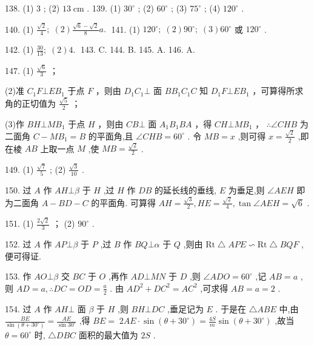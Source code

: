 \documentclass[10pt]{article}
\begin{document}
138. (1) 3 ; (2) \({13}\mathrm{\;{cm}}\) . 139. (1) \({30}^{ \circ  }\) ; (2) \({60}^{ \circ  }\) ; (3) \({75}^{ \circ  }\) ; (4) \({120}^{ \circ  }\) .

140. (1) \(\frac{\sqrt{2}}{4};\;\left( 2\right) \frac{\sqrt{6} - \sqrt{2}}{8}a.\;\) 141. (1) \({120}^{ \circ  };\;\left( 2\right) {90}^{ \circ  };\;\left( 3\right) {60}^{ \circ  }\) 或 \({120}^{ \circ  }\) .

142. (1) \(\frac{30}{13};\;\left( 2\right) 4.\;\) 143. C. 144. B. 145. A. 146. A.

147. (1) \(\frac{\sqrt{6}}{3}\) ；

(2)准 \({C}_{1}F \bot  E{B}_{1}\) 于点 \(F\) ，则由 \({D}_{1}{C}_{1} \bot\) 面 \(B{B}_{1}{C}_{1}C\) 知 \({D}_{1}F \bot  E{B}_{1}\) ，可算得所求角的正切值为 \(\frac{\sqrt{5}}{2}\) ；

(3)作 \({BH} \bot  M{B}_{1}\) 于点 \(H\) ，则由 \({CB} \bot\) 面 \({A}_{1}{B}_{1}{BA}\) ，得 \({CH} \bot  {M{B}_{1}}\) ， \(\therefore \angle {CHB}\) 为二面角 \(C - M{B}_{1} = B\) 的平面角,且 \(\angle {CHB} = {60}^{ \circ  }\) . 令 \({MB} = x\) ,则可得 \(x = \frac{\sqrt{2}}{2}\) ,即在棱 \({AB}\) 上取一点 \(M\) ,使 \({MB} = \frac{\sqrt{2}}{2}\) .

149. (1) \(\frac{\sqrt{7}}{5}\) ; (2) \(\frac{\sqrt{3}}{10}\) .

150. 过 \(A\) 作 \({AH} \bot  \beta\) 于 \(H\) ,过 \(H\) 作 \({DB}\) 的延长线的垂线, \(E\) 为垂足,则 \(\angle {AEH}\) 即为二面角 \(A - {BD} - C\) 的平面角. 可算得 \({AH} = \frac{\sqrt{3}}{2},{HE} = \frac{\sqrt{2}}{4},\tan \angle {AEH} = \sqrt{6}\) .

151. (1) \(\frac{2\sqrt{2}}{3}\) ； (2) \({90}^{ \circ  }\) .

152. 过 \(A\) 作 \({AP} \bot  \beta\) 于 \(P\) ,过 \(B\) 作 \({BQ} \bot  \alpha\) 于 \(Q\) ,则由 \(\mathrm{{Rt}} \bigtriangleup  {APE} \backsim  \mathrm{{Rt}} \bigtriangleup  {BQF}\) ,便可得证.

153. 作 \({AO} \bot  \beta\) 交 \({BC}\) 于 \(O\) ,再作 \({AD} \bot  {MN}\) 于 \(D\) ,则 \(\angle {ADO} = {60}^{ \circ  }\) ,记 \({AB} = a\) ,则 \({AD} = a,\therefore {DC} = {OD} = \frac{a}{2}\) . 由 \(A{D}^{2} + D{C}^{2} = A{C}^{2}\) ,可求得 \({AB} = a = 2\) .

154. 过 \(A\) 作 \({AH} \bot\) 面 \(\beta\) 于 \(H\) ,则 \({BH} \bot  {DC}\) ,垂足记为 \(E\) . 于是在 \(\bigtriangleup {ABE}\) 中,由 \(\frac{BE}{\sin \left( {\theta  + {30}^{ \circ  }}\right) } = \frac{AE}{\sin {30}^{ \circ  }}\) ,得 \({BE} = \; {2AE} \cdot  \sin \left( {\theta  + {30}^{ \circ  }}\right)  = \frac{4S}{m}\sin \left( {\theta  + {30}^{ \circ  }}\right)\) ,故当 \(\theta  = {60}^{ \circ  }\) 时, \(\bigtriangleup {DBC}\) 面积的最大值为 \({2S}\) .
\end{document}

